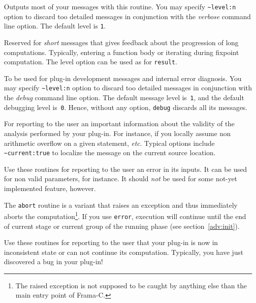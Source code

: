 \newcommand{\logroutine}[2]{%
\item[\ppcmd{#1}{#2}]%
\scodeidx{Log}{#1}\mbox{}\\%
}

\begin{description}

  Outputs most of your messages with this routine. You may specify
  \lstinline{~level:n} option to discard too detailed messages in
  conjunction with the \emph{verbose} command line option. The default
  level is \lstinline{1}.

  Reserved for \emph{short} messages that gives feedback about the
  progression of long computations. Typically, entering a function
  body or iterating during fixpoint computation.  The level option can
  be used as for \lstinline{result}.

  To be used for plug-in development messages and internal error
  diagnosis. You may specify \lstinline{~level:n} option to discard
  too detailed messages in conjunction with the \emph{debug} command
  line option. The default message level is~\lstinline{1}, and the
  default debugging level is~\lstinline{0}. Hence, without any option,
  \lstinline{debug} discards all its messages.

  For reporting to the user an important information about the
  validity of the analysis performed by your plug-in. For instance, if
  you locally assume non arithmetic overflow on a given statement,
  \emph{etc}. Typical options include \lstinline{~current:true} to
  localize the message on the current source location.

  Use these routines for reporting to the user an error in its
  inputs. It can be used for non valid parameters, for instance. It
  should \emph{not} be used for some not-yet implemented feature,
  however.

  The \lstinline{abort} routine is a variant that raises an exception
  and thus immediately aborts the computation\footnote{The raised
  exception is not supposed to be caught by anything else than the
  main entry point of Frama-C.}.
  If you use \lstinline{error},
  execution will continue until the end of current stage or current
  group of the running phase (see section~\ref{adv:init}).

  Use these routines for reporting to the user that your plug-in is
  now in inconsistent state or can not continue its
  computation. Typically, you have just discovered a bug in your plug-in!


\end{description}
